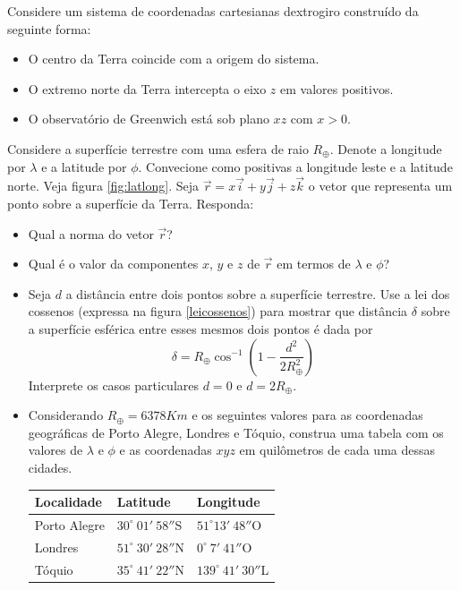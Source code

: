 \begin{exer}
Considere um sistema de coordenadas cartesianas dextrogiro construído da seguinte forma:

\begin{itemize}
\item O centro da Terra coincide com a origem do sistema.
\item O extremo norte da Terra intercepta o eixo $z$ em valores positivos.
\item O observatório de Greenwich está sob plano $xz$ com $x>0$.
\end{itemize}
Considere a superfície terrestre com uma esfera de raio $R_{\oplus}$. Denote a longitude por $\lambda$ e a latitude por $\phi$. Convecione como positivas a longitude leste  e a latitude norte. Veja figura \ref{fig:latlong}. Seja $\vec{r}=x\vec{i}+y\vec{j}+z\vec{k}$ o vetor que representa um ponto sobre a superfície da Terra. Responda:
\begin{itemize}
\item[a)] Qual a norma do vetor $\vec{r}$?
\item[b)] Qual é o valor da componentes $x$, $y$ e $z$ de $\vec{r}$ em termos de $\lambda$ e $\phi$?
\item[c)] Seja $d$ a distância entre dois pontos sobre a superfície terrestre. Use a lei dos cossenos (expressa na figura \ref{leicossenos}) para mostrar que distância $\delta$ sobre a superfície esférica entre esses mesmos dois pontos é dada por
$$\delta=R_\oplus \cos^{-1}\left(1-\frac{d^2}{2R_\oplus^2}\right)$$
Interprete os casos particulares $d=0$ e $d=2R_\oplus$.
\item[d)] Considerando $R_\oplus=6378Km$ e os seguintes valores para as coordenadas geográficas de Porto Alegre, Londres e Tóquio, construa uma tabela com os valores de $\lambda$ e $\phi$ e as coordenadas $xyz$ em quilômetros de cada uma dessas cidades.
\begin{table}[h]
	\centering
		\begin{tabular}{|l|l|l|}
		\hline
	  Localidade & Latitude & Longitude\\
		\hline
		Porto Alegre & $30^\circ~ 01{'}~58{''}$S & $51^\circ  13{'}~48{''}$O\\
  	\hline
		Londres & $51^\circ~ 30{'}~28{''}$N & $0^\circ~ 7{'}~41{''}$O\\
  	\hline
  	Tóquio & $35^\circ~ 41{'}~22{''}$N & $139^\circ ~41{'}~30{''}$L\\
  	\hline
		\end{tabular}

\end{table}
\end{itemize}
\end{exer}
